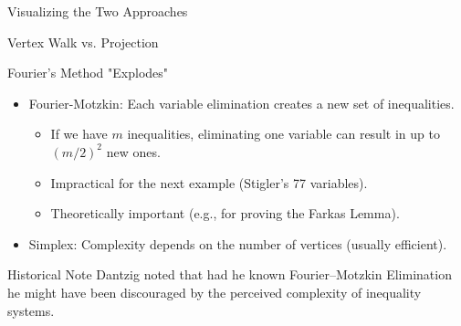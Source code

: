 \documentclass[presentation, aspectratio=169]{beamer}
\begin{document}
\begin{frame}[label={sec:org18fa8a1}]{Visualizing the Two Approaches}
\begin{block}{Vertex Walk vs. Projection}
\end{block}
\end{frame}


\begin{frame}[label={sec:org71e0553}]{Fourier's Method "Explodes"}
\begin{itemize}
\item \alert{Fourier-Motzkin}: Each variable elimination creates a new set of inequalities.
\begin{itemize}
\item If we have \(m\) inequalities, eliminating one variable can result in up to \((m/2)^2\) new ones.
\item Impractical for the next example (Stigler's 77 variables).
\item Theoretically important (e.g., for proving the Farkas Lemma).
\end{itemize}
\item \alert{Simplex}: Complexity depends on the number of \alert{vertices} (usually efficient).
\end{itemize}

\begin{block}{Historical Note}
Dantzig noted that had he known Fourier–Motzkin Elimination he might have been discouraged by the perceived complexity of inequality systems.
\end{block}
\end{frame}
\end{document}
